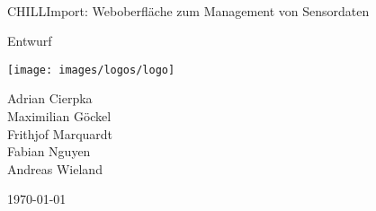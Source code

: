 \documentclass[a4paper, 12pt, titlepage]{article}
\begin{document}
\begin{titlepage}
	\centering
	{\ \vspace{1.5cm}\\ \LARGE CHILLImport: Weboberfläche zum Management von Sensordaten \par}
	\vspace{2cm}
	{\Large Entwurf\par}
	\vspace{2.5cm}
	\texttt{[image: images/logos/logo]}\par\vspace{4cm}
	{\large Adrian Cierpka \\
Maximilian Göckel \\
Frithjof Marquardt \\
Fabian Nguyen \\
Andreas Wieland\par}
	\vfill

	{\large \today\par}
\end{titlepage}

\tableofcontents
\clearpage
{} 


%

%








%
\end{document}

